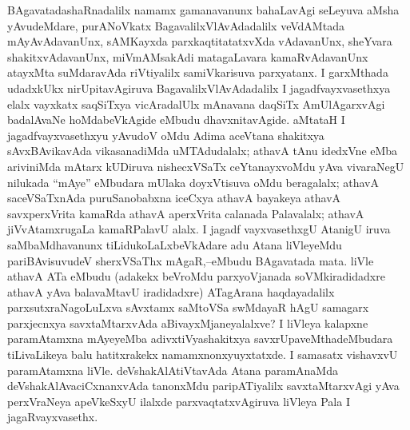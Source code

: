 BAgavatadashaRnadalilx namamx gamanavanunx bahaLavAgi seLeyuva aMsha yAvu\-deMdare, purANoVkatx BagavalilxVlAvAdadalilx veVdAMtada mAyAvAdavanUnx, sAMKayxda parxkaqtitatatxvXda vAdavanUnx, sheYvara shakitxvAdavanUnx, miVmAMsakAdi matagaLavara kamaRvAdavanUnx atayxMta suMdaravAda riVtiyalilx samiVkarisuva parxyatanx. I garxMthada udadxkUkx nirUpitavAgiruva BagavalilxVlAvAdadalilx I jagadfvayxvasethxya elalx vayxkatx saqSiTxya vicAradalUlx mAnavana daqSiTx AmUlAgarxvAgi badalAvaNe hoMdabeVkAgide eMbudu dhavxnitavAgide. aMtataH I jagadfvayxvasethxyu yAvudoV oMdu Adima aceVtana shakitxya sAvxBAvikavAda vikasanadiMda uMTAdudalalx; athavA tAnu idedxVne eMba ariviniMda mAtarx kUDiruva nishecxVSaTx ceYtanayxvoMdu yAva vivaraNegU nilukada ``mAye'' eMbudara mUlaka doyxVtisuva oMdu beragalalx; athavA saceVSaTxnAda puruSanobabxna iceCxya athavA bayakeya athavA savxperxVrita kamaRda athavA aperxVrita calanada Palavalalx; athavA jiVvAtamxrugaLa kamaRPalavU alalx. I jagadf vayxvasethxgU AtanigU iruva saMbaMdhavanunx tiLidukoLaLxbeVkAdare adu Atana liVleyeMdu pariBAvisuvudeV sherxVSaThx mAgaR,--eMbudu BAgavatada mata. liVle athavA ATa eMbudu (adakekx beVroMdu parxyoVjanada soVMkiradidadxre athavA yAva balavaMtavU iradidadxre) ATagArana haqdayadalilx parxsutxraNagoLuLxva sAvxtamx saMtoVSa swMdayaR hAgU samagarx parxjecnxya savxtaMtarxvAda aBivayxMjaneyalalxve? I liVleya kalapxne paramAtamxna mAyeyeMba adivxtiVyashakitxya savxrUpaveMthadeMbudara tiLivaLikeya balu hatitxrakekx namamxnonxyuyxtatxde. I samasatx vishavxvU paramAtamxna liVle. deVshakAlAtiVtavAda Atana paramAnaMda deVshakAlAvaciCxnanxvAda tanonxMdu paripATiyalilx savxtaMtarxvAgi yAva perxVraNeya apeVkeSxyU ilalxde parxvaqtatxvAgiruva liVleya Pala I jagaRvayxvasethx.

